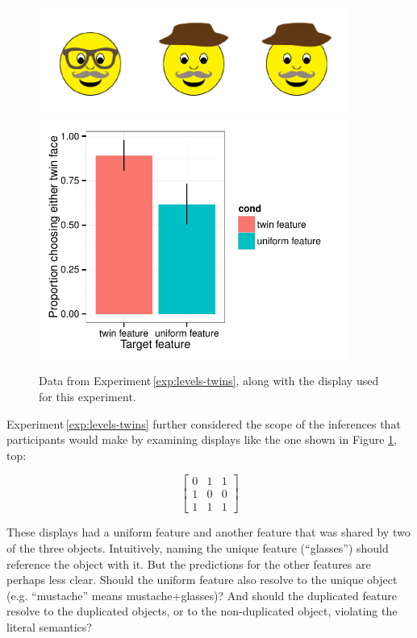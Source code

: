 \documentclass[man,noapacite]{apa2}
\newcounter{Experiment}
\newcommand{\exptref}[1]{Experiment\,\ref{#1}}
\begin{document}
 \begin{figure}[t]
  \centering
  \includegraphics[width=4in]{figures/levels-twins-stim.pdf}
  \includegraphics[width=4in]{../plots/3-levels-twins.pdf}
  \caption{\label{fig:levels-twins} Data from \exptref{exp:levels-twins}, along with the display used for this experiment.}
\end{figure}

\exptref{exp:levels-twins} further considered the scope of the inferences that participants would make by examining displays like the one shown in Figure \ref{fig:levels-twins}, top:

\begin{equation}
\left[
    \begin{array}{ccc}
      0 & 1 & 1 \\
      1 & 0 & 0\\
      1 & 1 & 1
    \end{array}
  \right]
\end{equation}

\noindent These displays had a uniform feature and another feature that was shared by two of the three objects. Intuitively, naming the unique feature (``glasses'') should reference the object with it. But the predictions for the other features are perhaps less clear. Should the uniform feature also resolve to the unique object (e.g. ``mustache'' means {\sc mustache+glasses})? And should the duplicated feature resolve to the duplicated objects, or to the non-duplicated object, violating the literal semantics?
\end{document}
